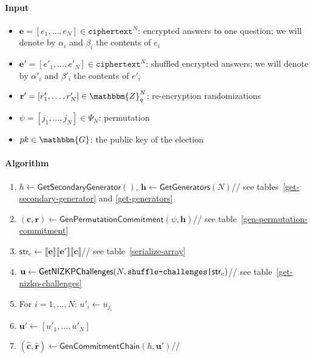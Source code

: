\documentclass[a4paper]{article}
\newcommand{\G}{\mathbbm{G}}
\newcommand{\Z}{\mathbbm{Z}}
\begin{document}
\begin{table}
  \small
  \begin{framed}
    \noindent\paragraph{Input}
    \begin{itemize}
    \item $\textbf{e}=[e_1,\dots,e_N]\in\texttt{ciphertext}^N$:
      encrypted answers to one question; we will denote by
      $\alpha_i$ and $\beta_i$ the contents of $e_i$
    \item $\textbf{e}'=[e'_1,\dots,e'_N]\in\texttt{ciphertext}^N$:
      shuffled encrypted answers; we will denote by
      $\alpha'_i$ and $\beta'_i$ the contents of $e'_i$
    \item $\textbf{r}'=[r'_1,\dots,r'_N]\in\Z_q^N$: re-encryption
      randomizations
    \item $\psi=[j_1,\dots,j_N]\in\Psi_N$: permutation
    \item $pk\in\G$: the public key of the election
    \end{itemize}
    \noindent\paragraph{Algorithm}
    \begin{enumerate}
    \item $h\leftarrow\textsf{GetSecondaryGenerator}()$,
      $\textbf{h}\leftarrow\textsf{GetGenerators}(N)$\hfill// see
      tables~\ref{get-secondary-generator} and \ref{get-generators}
    \item
      $(\textbf{c},\textbf{r})\leftarrow\textsf{GenPermutationCommitment}(\psi,\textbf{h})$\hfill//
      see table~\ref{gen-permutation-commitment}
    \item
      $\textsf{str}_c\leftarrow\llbracket\textbf{e}\rrbracket\llbracket\textbf{e}'\rrbracket\llbracket\textbf{c}\rrbracket$\hfill//
      see table~\ref{serialize-array}
    \item
      $\textbf{u}\leftarrow\textsf{GetNIZKPChallenges}(N,\verb=shuffle-challenges|=\textsf{str}_c)$\hfill//
      see table~\ref{get-nizkp-challenges}
    \item For $i=1,\dots,N$: $u'_i\leftarrow u_{j_i}$
    \item $\textbf{u}'\leftarrow[u'_1,\dots,u'_N]$
    \item
      $(\hat{\textbf{c}},\hat{\textbf{r}})\leftarrow\textsf{GenCommitmentChain}(h,\textbf{u}')$\hfill//

\end{enumerate}
\end{framed}
\end{table}
\end{document}
